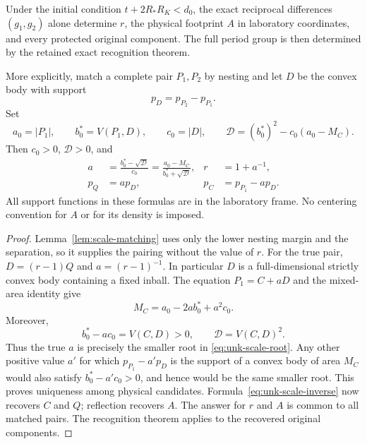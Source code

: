 \begin{theorem}
\label{thm:unk-scale-exact}
Under the initial condition $t+2R_*R_K<d_0$, the exact reciprocal
differences $(g_1,g_2)$ alone determine $r$, the physical footprint
$A$ in laboratory coordinates,
and every protected original component. The full period group is then
determined by the retained exact recognition theorem.

More explicitly, match a complete pair $P_1,P_2$ by nesting and let
$D$ be the convex body with support
\begin{equation}\label{eq:unk-scale-difference}
                         p_D=p_{P_2}-p_{P_1}.
\end{equation}
Set
\[
 a_0=|P_1|,\qquad b_0^*=V(P_1,D),\qquad c_0=|D|,
 \qquad \mathcal D=(b_0^*)^2-c_0(a_0-M_C).
\]
Then $c_0>0$, $\mathcal D>0$, and
\begin{align}
 a&=\frac{b_0^*-\sqrt{\mathcal D}}{c_0}
    =\frac{a_0-M_C}{b_0^*+\sqrt{\mathcal D}},
 &r&=1+a^{-1},\label{eq:unk-scale-root}\\
 p_Q&=a p_D,
 &p_C&=p_{P_1}-a p_D.\label{eq:unk-scale-inverse}
\end{align}
All support functions in these formulas are in the laboratory frame.
No centering convention for $A$ or for its density is imposed.
\end{theorem}
\begin{proof}
Lemma~\ref{lem:scale-matching} uses only the lower nesting margin and
the separation, so it supplies the pairing without the value of $r$.
For the true pair, $D=(r-1)Q$ and $a=(r-1)^{-1}$. In particular $D$
is a full-dimensional strictly convex body containing a fixed inball.
The equation $P_1=C+aD$ and the mixed-area identity give
\[
           M_C=a_0-2a b_0^*+a^2c_0.
\]
Moreover,
\begin{equation}\label{eq:unk-scale-root-margin}
 b_0^*-ac_0=V(C,D)>0,
 \qquad \mathcal D=V(C,D)^2.
\end{equation}
Thus the true $a$ is precisely the smaller root in
\eqref{eq:unk-scale-root}. Any other positive value $a'$ for which
$p_{P_1}-a'p_D$ is the support of a convex body of area $M_C$ would
also satisfy $b_0^*-a'c_0>0$, and hence would be the same smaller
root. This proves uniqueness among physical candidates.
Formula~\eqref{eq:unk-scale-inverse} now recovers $C$ and $Q$;
reflection recovers $A$. The answer for $r$ and $A$ is common to all
matched pairs. The recognition theorem applies to the recovered
original components.
\end{proof}

